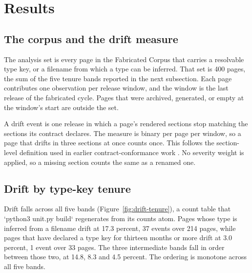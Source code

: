 
\section{Results}

\subsection{The corpus and the drift measure}

The analysis set is every page in the Fabricated Corpus that carries a resolvable type key, or a filename from which a type can be inferred.
That set is 400 pages, the sum of the five tenure bands reported in the next subsection.
Each page contributes one observation per release window, and the window is the last release of the fabricated cycle.
Pages that were archived, generated, or empty at the window's start are outside the set.

A drift event is one release in which a page's rendered sections stop matching the sections its contract declares.
The measure is binary per page per window, so a page that drifts in three sections at once counts once.
This follows the section-level definition used in earlier contract-conformance work \cite{TOADD}.
No severity weight is applied, so a missing section counts the same as a renamed one.

\subsection{Drift by type-key tenure}

Drift falls across all five bands (Figure~\ref{fig:drift-tenure}), a count table that `python3 unit.py build` regenerates from its counts atom.
Pages whose type is inferred from a filename drift at 17.3 percent, 37 events over 214 pages, while pages that have declared a type key for thirteen months or more drift at 3.0 percent, 1 event over 33 pages.
The three intermediate bands fall in order between those two, at 14.8, 8.3 and 4.5 percent.
The ordering is monotone across all five bands.

